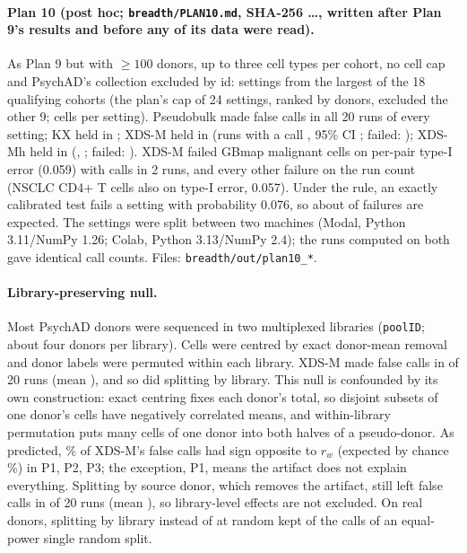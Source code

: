

\paragraph{Plan 10 (post hoc; \texttt{breadth/PLAN10.md}, SHA-256 \BtSha\ldots, written after Plan 9's results and before any of its data were read).} As Plan 9 but with $\ge100$ donors, up to three cell types per cohort, no cell cap and PsychAD's collection excluded by id: \BtN{} settings from the \BtColl{} largest of the 18 qualifying cohorts (the plan's cap of 24 settings, ranked by donors, excluded the other 9; \BtCells{} cells per setting). Pseudobulk made false calls in all 20 runs of every setting; KX held in \BtKXheld; XDS-M held in \BtXheld{} (runs with a call \BtXpct, 95\% CI \BtXci; failed: \BtXfail); XDS-Mh held in \BtHheld{} (\BtHpct, \BtHci; failed: \BtHfail). XDS-M failed GBmap malignant cells on per-pair type-I error (0.059) with calls in 2 runs, and every other failure on the run count (NSCLC CD4+ T cells also on type-I error, 0.057). Under the rule, an exactly calibrated test fails a setting with probability 0.076, so about \BtExpFail{} of \BtN{} failures are expected. The settings were split between two machines (Modal, Python 3.11/NumPy 1.26; Colab, Python 3.13/NumPy 2.4); the \BtOverlap{} runs computed on both gave identical call counts. Files: \texttt{breadth/out/plan10\_*}.




\paragraph{Library-preserving null.} Most PsychAD donors were sequenced in two multiplexed libraries (\texttt{poolID}; about four donors per library). Cells were centred by exact donor-mean removal and donor labels were permuted within each library. XDS-M made false calls in \LnXany{} of 20 runs (mean \LnXmean), and so did splitting by library. This null is confounded by its own construction: exact centring fixes each donor's total, so disjoint subsets of one donor's cells have negatively correlated means, and within-library permutation puts many cells of one donor into both halves of a pseudo-donor. As predicted, \LnOpp\% of XDS-M's false calls had sign opposite to $r_w$ (expected by chance \LnOppBase\%) in P1, P2, P3; the exception, P1, means the artifact does not explain everything. Splitting by source donor, which removes the artifact, still left false calls in \LnSrcAny{} of 20 runs (mean \LnSrcMean), so library-level effects are not excluded. On real donors, splitting by library instead of at random kept \LibKeep{} of the calls of an equal-power single random split.

